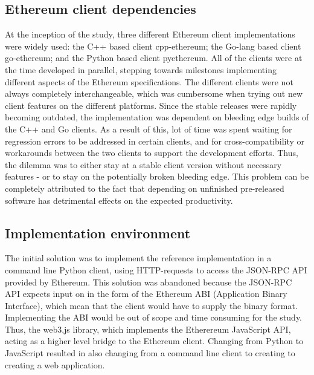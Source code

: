 \subsection{Ethereum client dependencies}
At the inception of the study, three different Ethereum client implementations were widely used: the C++ based client cpp-ethereum; the Go-lang based client go-ethereum; and the Python based client pyethereum. All of the clients were at the time developed in parallel, stepping towards milestones implementing different aspects of the Ethereum specifications. The different clients were not always completely interchangeable, which was cumbersome when trying out new client features on the different platforms. Since the stable releases were rapidly becoming outdated, the implementation was dependent on bleeding edge builds of the C++ and Go clients. As a result of this, lot of time was spent waiting for regression errors to be addressed in certain clients, and for cross-compatibility or workarounds between the two clients to support the development efforts. Thus, the dilemma was to either stay at a stable client version without necessary features - or to stay on the potentially broken bleeding edge. This problem can be completely attributed to the fact that depending on unfinished pre-released software has detrimental effects on the expected productivity.

\subsection{Implementation environment}
The initial solution was to implement the reference implementation in a command line Python client, using HTTP-requests to access the JSON-RPC API provided by Ethereum. This solution was abandoned because the JSON-RPC API expects input on in the form of the Ethereum ABI (Application Binary Interface), which mean that the client would have to supply the binary format. Implementing the ABI would be out of scope and time consuming for the study. Thus, the web3.js library, which implements the Etherereum JavaScript API, acting as a higher level bridge to the Ethereum client. Changing from Python to JavaScript resulted in also changing from a command line client to creating to creating a web application.

